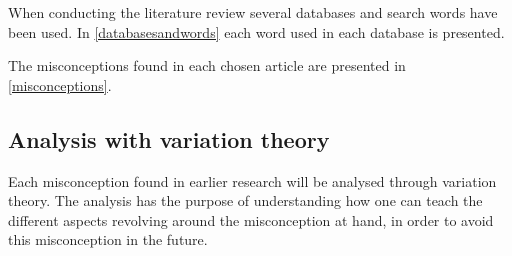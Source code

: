 When conducting the literature review several databases and search words 
have 
been used. In \cref{databasesandwords} each word used in each database is 
presented.

The misconceptions found in each chosen article are presented in 
\cref{misconceptions}. 


\subsection{Analysis with variation theory}

Each misconception found in earlier research will be analysed through 
variation theory. The analysis has the purpose of understanding how one can 
teach the different aspects revolving around the misconception at hand, in 
order to avoid this misconception in the future. 
